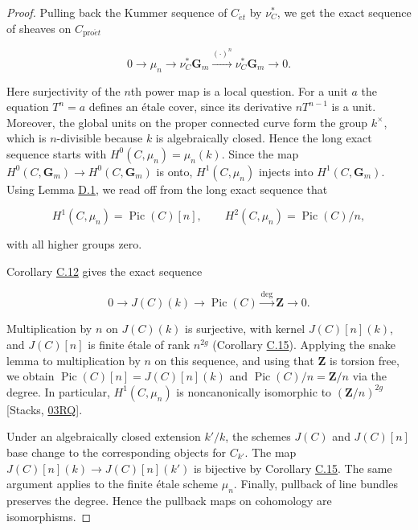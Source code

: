 \documentclass[11pt]{article}
\begin{document}
\begin{proof}[{Proof}]\label{bp180}%
Pulling back the Kummer sequence of \(C_{\acute{e}t}\) by \(\nu_C^*\), we get the exact sequence of sheaves on \(C_{\mathrm{pro}\acute{e}t}\)

\[
0\longrightarrow\mu_n\longrightarrow\nu_C^*\mathbf G_m
\xrightarrow{(\cdot)^n}\nu_C^*\mathbf G_m
\longrightarrow0.
\]

Here surjectivity of the \(n\)th power map is a local question. For a unit \(a\) the equation \(T^n=a\) defines an étale cover, since its derivative \(nT^{n-1}\) is a unit. Moreover, the global units on the proper connected curve form the group \(k^\times\), which is \(n\)-divisible because \(k\) is algebraically closed. Hence the long exact sequence starts with \(H^0(C,\mu_n)=\mu_n(k)\). Since the map \(H^0(C,\mathbf G_m)\to H^0(C,\mathbf G_m)\) is onto, \(H^1(C,\mu_n)\) injects into \(H^1(C,\mathbf G_m)\). Using Lemma \hyperref[bp176]{D.1}, we read off from the long exact sequence that

\[
H^1(C,\mu_n)=\operatorname{Pic}(C)[n],\qquad
H^2(C,\mu_n)=\operatorname{Pic}(C)/n,
\]

with all higher groups zero.

Corollary \hyperref[bp157]{C.12} gives the exact sequence

\[
0\longrightarrow J(C)(k)\longrightarrow\operatorname{Pic}(C)
\xrightarrow{\deg}\mathbf Z\longrightarrow0.
\]

Multiplication by \(n\) on \(J(C)(k)\) is surjective, with kernel \(J(C)[n](k)\), and \(J(C)[n]\) is finite étale of rank \(n^{2g}\) (Corollary \hyperref[bp163]{C.15}).  Applying the snake lemma to multiplication by \(n\) on this sequence, and using that \(\mathbf Z\) is torsion free, we obtain \(\operatorname{Pic}(C)[n]=J(C)[n](k)\) and \(\operatorname{Pic}(C)/n=\mathbf Z/n\) via the degree. In particular, \(H^1(C,\mu_n)\) is noncanonically isomorphic to \((\mathbf Z/n)^{2g}\) [Stacks, \href{https://stacks.math.columbia.edu/tag/03RQ}{03RQ}].

Under an algebraically closed extension \(k'/k\), the schemes \(J(C)\) and \(J(C)[n]\) base change to the corresponding objects for \(C_{k'}\). The map \(J(C)[n](k)\to J(C)[n](k')\) is bijective by Corollary \hyperref[bp163]{C.15}. The same argument applies to the finite étale scheme \(\mu_n\). Finally, pullback of line bundles preserves the degree. Hence the pullback maps on cohomology are isomorphisms.
\end{proof}
\end{document}
